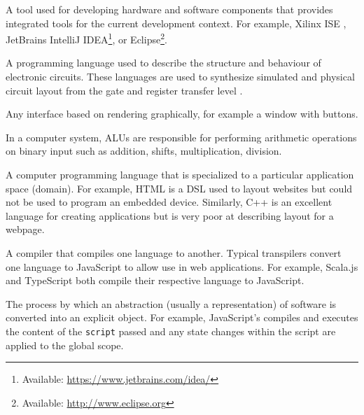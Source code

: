 \begin{definition}
    A tool used for developing hardware and software components that provides integrated tools for the current development context. For example, Xilinx ISE \cite{xilinxISE}, JetBrains IntelliJ IDEA\footnote{Available: \url{https://www.jetbrains.com/idea/}}, or Eclipse\footnote{Available: \url{http://www.eclipse.org}}.
\end{definition}

\begin{definition}
    A programming language used to describe the structure and behaviour of electronic circuits. These languages are used to synthesize simulated and physical circuit layout from the gate and register transfer level \cite{Chu2006}.
\end{definition}

\begin{definition}
    Any interface based on rendering graphically, for example a window with buttons. 
\end{definition}

\begin{definition}
    In a computer system, ALUs are responsible for performing arithmetic operations on binary input such as addition, shifts, multiplication, division.
\end{definition}

\begin{definition}
    A computer programming language that is specialized to a particular application space (domain). For example, HTML is a DSL used to layout websites but could not be used to program an embedded device. Similarly, C++ is an excellent language for creating applications but is very poor at describing layout for a webpage.
\end{definition}

\begin{definition}[Transpiler]
    A compiler that compiles one language to another. Typical transpilers convert one language to JavaScript to allow use in web applications. For example, Scala.js and TypeScript both compile their respective language to JavaScript.
\end{definition}

\begin{definition}[Reification]
    The process by which an abstraction (usually a  representation) of software is converted into an explicit object. For example, JavaScript's  compiles and executes the content of the \verb|script| passed and any state changes within the script are applied to the global scope.
\end{definition}

